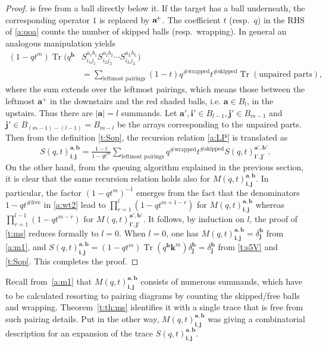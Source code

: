 \documentclass[11pt]{article}
\theoremstyle{definition}
\numberwithin{equation}{section}
\newcommand{\ap}{{\rm\aaa}^{\!+} }
\newcommand{\abs}[1]{\lvert #1 \rvert}
\newcommand{\aaa}{\mathbf{a}}
\newcommand{\bb}{\mathbf{b}}
\newcommand{\hh}{\mathbf{h}}
\newcommand{\ii}{\mathbf{i}}
\newcommand{\jj}{\mathbf{j}}
\newcommand{\kk}{\mathbf{k}}
\DeclareMathOperator{\tr}{Tr}
\begin{document}
\begin{proof}
is free from a ball directly below it. If the target has a ball underneath, 
the corresponding operator $1$ is replaced by $\ap$.
The coefficient $t$ (resp.\ $q$) in the RHS of \eqref{a:qoa} counts the number of skipped balls
(resp.\ wrapping). 
%
In general an analogous manipulation yields
\begin{equation}
\label{a:LP}
\begin{aligned}
(1-qt^m)\tr \bigl(q^\hh & S_{i_1j_1}^{a_1b_1} S_{i_2j_2}^{a_2b_2} \cdots S_{i_Lj_L}^{a_Lb_L} \bigr)
\\ & = \sum_{\text{leftmost pairings}}\!\!
(1-t) q^{\#\text{wrapped}}t^{\#\text{skipped}}
\tr(\text{unpaired parts}),
\end{aligned}
\end{equation}
where the sum extends over the leftmost pairings, which means those between the leftmost $\aaa^+$ in the downstairs and 
the red shaded balls, i.e. $\aaa \in B_l$, in the upstairs. Thus there are $\abs{\aaa} = l$ summands.
Let $\aaa', \ii'  \in B_{l-1},  \jj'  \in B_{m-1}$ and $\jj' \in B_{(m-1)-(l-1)}=B_{m-l}$ 
be the arrays corresponding to the unpaired parts.
Then from the definition \eqref{t:Sop},   the  recursion relation \eqref{a:LP}
is translated as
\begin{align}
S(q,t)^{\aaa, \bb}_{\ii,\jj} 
= \frac{1-t}{1-qt^m}\sum_{\text{leftmost pairings}}
q^{\#\text{wrapped}}t^{\#\text{skipped}}
S(q,t)^{\aaa', \bb'}_{\ii',\jj'}.
\end{align}
%
On the other hand,  from the queuing algorithm explained in the previous section,
it is clear that the same recursion relation holds also for $M(q,t)^{\aaa, \bb}_{\ii,\jj}$.
In particular, the factor $(1-qt^m)^{-1}$ emerges from the fact that 
the denominators $1-qt^{\#\text{free}}$ in \eqref{a:wt2} lead to 
$\prod_{r=1}^l(1-qt^{m+1-r})$ for $M(q,t)^{\aaa, \bb}_{\ii,\jj}$ 
whereas $\prod_{r=1}^{l-1}(1-qt^{m-r})$ for $M(q,t)^{\aaa', \bb'}_{\ii',\jj'}$.
It follows, by induction on $l$, the proof of \eqref{t:ms} reduces formally to $l=0$.
When $l=0$, one has $M(q,t)^{\aaa, \bb}_{\ii,\jj}=\delta^\bb_\jj$ from \eqref{a:m1}, 
and $S(q,t)^{\aaa, \bb}_{\ii,\jj} = (1-qt^m)\tr(q^\hh \kk^m)\delta^\bb_\jj=\delta^\bb_\jj$ from
\eqref{t:s5V} and \eqref{t:Sop}.
This completes the proof.
\end{proof}

Recall from~\eqref{a:m1} that $M(q,t)^{\aaa, \bb}_{\ii,\jj}$ consists of 
numerous summands, 
which have to be calculated resorting to pairing diagrams by counting the skipped/free balls and wrapping.
Theorem~\ref{t:th:ms} identifies it with a single trace that is free from such pairing details.
Put in the other way, $M(q,t)^{\aaa, \bb}_{\ii,\jj}$ was giving a combinatorial description for an expansion 
of the trace $S(q,t)^{\aaa, \bb}_{\ii,\jj}$. 
\end{document}

